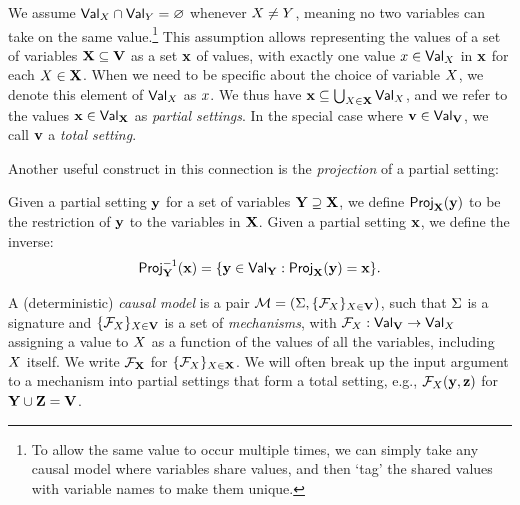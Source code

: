 \documentclass[twoside,11pt]{article}
\begin{document}
\begin{definition} \label{def:settings}

We assume $\mathsf{Val}_{X} \cap \mathsf{Val}_{Y} = \varnothing$ whenever $X \neq Y$, meaning no two variables can take on the same value.\footnote{To allow the same value to occur multiple times, we can simply take any causal model where variables share values, and then `tag' the shared values with variable names to make them unique.} This assumption allows representing the values of a set of variables $\mathbf{X} \subseteq \mathbf{V}$ as a set $\mathbf{x}$ of values, with exactly one value $x \in \mathsf{Val}_{X}$ in $\mathbf{x}$ for each $X \in \mathbf{X}$. When we need to be specific about the choice of variable $X$, we denote this element of $\mathsf{Val}_{X}$ as $x$.
We thus have $\mathbf{x} \subseteq \bigcup_{X\in \mathbf{X}} \mathsf{Val}_{X}$, and we refer to the values $\mathbf{x} \in \mathsf{Val}_{\mathbf{X}} $  as  \emph{partial settings}. 
In the special case where $\mathbf{v}\in \mathsf{Val}_{\mathbf{V}}$, we call $\mathbf{v}$ a \emph{total setting}. 
\end{definition}


Another useful construct in this connection is the \emph{projection} of a partial setting:
\begin{definition}[Projection]\label{def:projection}

Given a partial setting $\mathbf{y}$ for a set of variables $\mathbf{Y} \supseteq \mathbf{X}$, we define $\mathsf{Proj}_{\mathbf{X}}(\mathbf{y})$ to be the restriction of $\mathbf{y}$ to the variables in $\mathbf{X}$. Given a partial setting $\mathbf{x}$, we define the inverse:
\[ \mathsf{Proj}^{-1}_{\mathbf{Y}}(\mathbf{x}) = \{\mathbf{y} \in \mathsf{Val}_{\mathbf{Y}}: \mathsf{Proj}_{\mathbf{X}}(\mathbf{y}) = \mathbf{x} \}. \] 
\end{definition}

\begin{definition} \label{def:causalmodel}
A (deterministic) \emph{causal model} is a pair $\mathcal{M} = (\Sigma,\{\mathcal{F}_{X}\}_{X \in \mathbf{V}})$, such that $\Sigma$ is a signature and $\{\mathcal{F}_{X}\}_{X \in \mathbf{V}}$ is a set of \emph{mechanisms}, with $\mathcal{F}_{X}: \mathsf{Val}_{\mathbf{V}} \rightarrow \mathsf{Val}_{X}$ assigning a value to $X$  as a function of the values of all the variables, including $X$ itself. We write $\mathcal{F}_{\mathbf{X}}$ for $\{\mathcal{F}_{X}\}_{X \in \mathbf{X}}$. We will often break up the input argument to a mechanism into partial settings that form a total setting, e.g., $\mathcal{F}_{X}(\mathbf{y}, \mathbf{z})$ for $\mathbf{Y} \cup \mathbf{Z} = \mathbf{V}$.
\end{definition}
\end{document}
